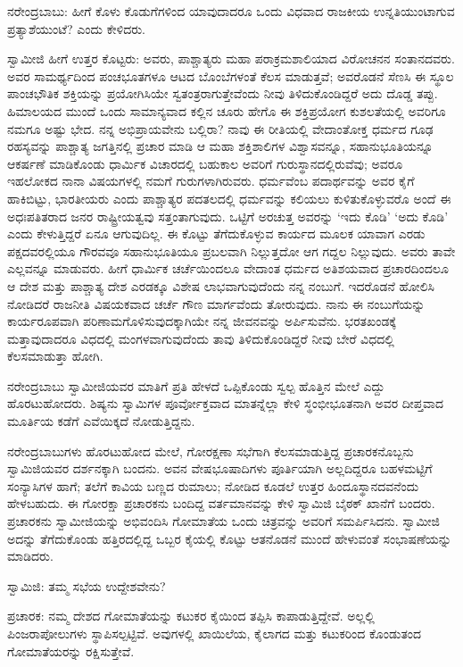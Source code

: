 ನರೇಂದ್ರಬಾಬು: ಹೀಗೆ ಕೊಳು ಕೊಡುಗೆಗಳಿಂದ ಯಾವುದಾದರೂ ಒಂದು ವಿಧವಾದ ರಾಜಕೀಯ ಉನ್ನತಿಯುಂಟಾಗುವ ಪ್ರತ್ಯಾಶೆಯುಂಟೆ? ಎಂದು ಕೇಳಿದರು.

ಸ್ವಾಮೀಜಿ ಹೀಗೆ ಉತ್ತರ ಕೊಟ್ಟರು: ಅವರು, ಪಾಶ್ಚಾತ್ಯರು ಮಹಾ ಪರಾಕ್ರಮಶಾಲಿಯಾದ ವಿರೋಚನನ ಸಂತಾನದವರು. ಅವರ ಸಾಮರ್ಥ್ಯದಿಂದ ಪಂಚಭೂತಗಳೂ ಆಟದ ಬೊಂಬೆಗಳಂತೆ ಕೆಲಸ ಮಾಡುತ್ತವೆ; ಅವರೊಡನೆ ಸೆಣಸಿ ಈ ಸ್ಥೂಲ ಪಾಂಚಭೌತಿಕ ಶಕ್ತಿಯನ್ನು ಪ್ರಯೋಗಿಸಿಯೇ ಸ್ವತಂತ್ರರಾಗುತ್ತೇವೆಂದು ನೀವು ತಿಳಿದುಕೊಂಡಿದ್ದರೆ ಅದು ದೊಡ್ಡ ತಪ್ಪು. ಹಿಮಾಲಯದ ಮುಂದೆ ಒಂದು ಸಾಮಾನ್ಯವಾದ ಕಲ್ಲಿನ ಚೂರು ಹೇಗೊ ಈ ಶಕ್ತಿಪ್ರಯೋಗ ಕುಶಲತೆಯಲ್ಲಿ ಅವರಿಗೂ ನಮಗೂ ಅಷ್ಟು ಭೇದ. ನನ್ನ ಅಭಿಪ್ರಾಯವೇನು ಬಲ್ಲಿರಾ? ನಾವು ಈ ರೀತಿಯಲ್ಲಿ ವೇದಾಂತೋಕ್ತ ಧರ್ಮದ ಗೂಢ ರಹಸ್ಯವನ್ನು ಪಾಶ್ಚಾತ್ಯ ಜಗತ್ತಿನಲ್ಲಿ ಪ್ರಚಾರ ಮಾಡಿ ಆ ಮಹಾ ಶಕ್ತಿಶಾಲಿಗಳ ವಿಶ್ವಾಸವನ್ನೂ, ಸಹಾನುಭೂತಿಯನ್ನೂ ಆಕರ್ಷಣೆ ಮಾಡಿಕೊಂಡು ಧಾರ್ಮಿಕ ವಿಚಾರದಲ್ಲಿ ಬಹುಕಾಲ ಅವರಿಗೆ ಗುರುಸ್ಥಾನದಲ್ಲಿರುವೆವು; ಅವರೂ ಇಹಲೋಕದ ನಾನಾ ವಿಷಯಗಳಲ್ಲಿ ನಮಗೆ ಗುರುಗಳಾಗಿರುವರು. ಧರ್ಮವೆಂಬ ಪದಾರ್ಥವನ್ನು ಅವರ ಕೈಗೆ ಹಾಕಿಬಿಟ್ಟು, ಭಾರತೀಯರು ಎಂದು ಪಾಶ್ಚಾತ್ಯರ ಪದತಲದಲ್ಲಿ ಧರ್ಮವನ್ನು ಕಲಿಯಲು ಕುಳಿತುಕೊಳ್ಳುವರೊ ಅಂದೆ ಈ ಅಧಃಪತಿತರಾದ ಜನರ ರಾಷ್ಟ್ರೀಯತ್ವವು ಸತ್ತಂತಾಗುವುದು. ಒಟ್ಟಿಗೆ ಅರಚುತ್ತ ಅವರನ್ನು ‘ಇದು ಕೊಡಿ’ ‘ಅದು ಕೊಡಿ’ ಎಂದು ಕೇಳುತ್ತಿದ್ದರೆ ಏನೂ ಆಗುವುದಿಲ್ಲ. ಈ ಕೊಟ್ಟು ತೆಗೆದುಕೊಳ್ಳುವ ಕಾರ್ಯದ ಮೂಲಕ ಯಾವಾಗ ಎರಡು ಪಕ್ಷದವರಲ್ಲಿಯೂ ಗೌರವವೂ ಸಹಾನುಭೂತಿಯೂ ಪ್ರಬಲವಾಗಿ ನಿಲ್ಲುತ್ತದೋ ಆಗ ಗದ್ದಲ ನಿಲ್ಲುವುದು. ಅವರು ತಾವೇ ಎಲ್ಲವನ್ನೂ ಮಾಡುವರು. ಹೀಗೆ ಧಾರ್ಮಿಕ ಚರ್ಚೆಯಿಂದಲೂ ವೇದಾಂತ ಧರ್ಮದ ಅತಿಶಯವಾದ ಪ್ರಚಾರದಿಂದಲೂ ಆ ದೇಶ ಮತ್ತು ಪಾಶ್ಚಾತ್ಯ ದೇಶ ಎರಡಕ್ಕೂ ವಿಶೇಷ ಲಾಭವಾಗುವುದೆಂದು ನನ್ನ ನಂಬುಗೆ. ಇದರೊಡನೆ ಹೋಲಿಸಿ ನೋಡಿದರೆ ರಾಜನೀತಿ ವಿಷಯಕವಾದ ಚರ್ಚೆ ಗೌಣ ಮಾರ್ಗವೆಂದು ತೋರುವುದು. ನಾನು ಈ ನಂಬುಗೆಯನ್ನು ಕಾರ್ಯರೂಪವಾಗಿ ಪರಿಣಾಮಗೊಳಿಸುವುದಕ್ಕಾಗಿಯೇ ನನ್ನ ಜೀವನವನ್ನು ಅರ್ಪಿಸುವೆನು. ಭರತಖಂಡಕ್ಕೆ ಮತ್ತಾವುದಾದರೂ ವಿಧದಲ್ಲಿ ಮಂಗಳವಾಗುವುದೆಂದು ತಾವು ತಿಳಿದುಕೊಂಡಿದ್ದರೆ ನೀವು ಬೇರೆ ವಿಧದಲ್ಲಿ ಕೆಲಸಮಾಡುತ್ತಾ ಹೋಗಿ.

ನರೇಂದ್ರಬಾಬು ಸ್ವಾಮೀಜಿಯವರ ಮಾತಿಗೆ ಪ್ರತಿ ಹೇಳದೆ ಒಪ್ಪಿಕೊಂಡು ಸ್ವಲ್ಪ ಹೊತ್ತಿನ ಮೇಲೆ ಎದ್ದು ಹೊರಟುಹೋದರು. ಶಿಷ್ಯನು ಸ್ವಾಮಿಗಳ ಪೂರ್ವೋಕ್ತವಾದ ಮಾತನ್ನೆಲ್ಲಾ ಕೇಳಿ ಸ್ಥಂಭೀಭೂತನಾಗಿ ಅವರ ದೀಪ್ತವಾದ ಮೂರ್ತಿಯ ಕಡೆಗೆ ಎವೆಯಿಕ್ಕದೆ ನೋಡುತ್ತಿದ್ದನು.

ನರೇಂದ್ರಬಾಬುಗಳು ಹೊರಟುಹೋದ ಮೇಲೆ, ಗೋರಕ್ಷಣಾ ಸಭೆಗಾಗಿ ಕೆಲಸಮಾಡುತ್ತಿದ್ದ ಪ್ರಚಾರಕನೊಬ್ಬನು ಸ್ವಾಮಿಜಿಯವರ ದರ್ಶನಕ್ಕಾಗಿ ಬಂದನು. ಅವನ ವೇಷಭೂಷಾದಿಗಳು ಪೂರ್ತಿಯಾಗಿ ಅಲ್ಲದಿದ್ದರೂ ಬಹಳಮಟ್ಟಿಗೆ ಸಂನ್ಯಾಸಿಗಳ ಹಾಗೆ; ತಲೆಗೆ ಕಾವಿಯ ಬಣ್ಣದ ರುಮಾಲು; ನೋಡಿದ ಕೂಡಲೆ ಉತ್ತರ ಹಿಂದೂಸ್ಥಾನದವನೆಂದು ಹೇಳಬಹುದು. ಈ ಗೋರಕ್ಷಾ ಪ್ರಚಾರಕನು ಬಂದಿದ್ದ ವರ್ತಮಾನವನ್ನು ಕೇಳಿ ಸ್ವಾಮಿಜಿ ಬೈಠಕ್ ಖಾನೆಗೆ ಬಂದರು. ಪ್ರಚಾರಕನು ಸ್ವಾಮೀಜಿಯನ್ನು ಅಭಿವಂದಿಸಿ ಗೋಮಾತೆಯ ಒಂದು ಚಿತ್ರವನ್ನು ಅವರಿಗೆ ಸಮರ್ಪಿಸಿದನು. ಸ್ವಾಮೀಜಿ ಅದನ್ನು ತೆಗೆದುಕೊಂಡು ಹತ್ತಿರದಲ್ಲಿದ್ದ ಒಬ್ಬರ ಕೈಯಲ್ಲಿ ಕೊಟ್ಟು ಆತನೊಡನೆ ಮುಂದೆ ಹೇಳುವಂತೆ ಸಂಭಾಷಣೆಯನ್ನು ಮಾಡಿದರು.

ಸ್ವಾಮಿಜಿ: ತಮ್ಮ ಸಭೆಯ ಉದ್ದೇಶವೇನು?

ಪ್ರಚಾರಕ: ನಮ್ಮ ದೇಶದ ಗೋಮಾತೆಯನ್ನು ಕಟುಕರ ಕೈಯಿಂದ ತಪ್ಪಿಸಿ ಕಾಪಾಡುತ್ತಿದ್ದೇವೆ. ಅಲ್ಲಲ್ಲಿ ಪಿಂಜರಾಪೋಲುಗಳು ಸ್ಥಾಪಿಸಲ್ಪಟ್ಟಿವೆ. ಅವುಗಳಲ್ಲಿ ಖಾಯಿಲೆಯ, ಕೈಲಾಗದ ಮತ್ತು ಕಟುಕರಿಂದ ಕೊಂಡುತಂದ ಗೋಮಾತೆಯರನ್ನು ರಕ್ಷಿಸುತ್ತೇವೆ.


